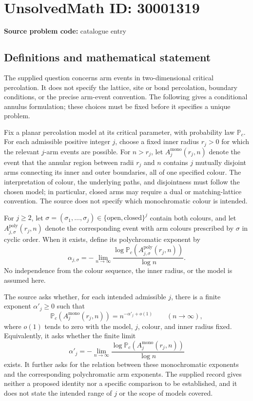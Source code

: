 \documentclass[11pt]{article}
\begin{document}
\section*{UnsolvedMath ID: 30001319}
\textbf{Source problem code:} catalogue entry
\subsection{Definitions and mathematical statement}
The supplied question concerns arm events in two-dimensional critical percolation. It does not specify the lattice, site or bond percolation, boundary conditions, or the precise arm-event convention. The following gives a conditional annulus formulation; these choices must be fixed before it specifies a unique problem.

Fix a planar percolation model at its critical parameter, with probability law \(\mathbb P_c\). For each admissible positive integer \(j\), choose a fixed inner radius \(r_j>0\) for which the relevant \(j\)-arm events are possible. For \(n>r_j\), let \(A_j^{\mathrm{mono}}(r_j,n)\) denote the event that the annular region between radii \(r_j\) and \(n\) contains \(j\) mutually disjoint arms connecting its inner and outer boundaries, all of one specified colour. The interpretation of colour, the underlying paths, and disjointness must follow the chosen model; in particular, closed arms may require a dual or matching-lattice convention. The source does not specify which monochromatic colour is intended.

For \(j\geq 2\), let \(\sigma=(\sigma_1,\ldots,\sigma_j)\in\{\mathrm{open},\mathrm{closed}\}^j\) contain both colours, and let \(A_{j,\sigma}^{\mathrm{poly}}(r_j,n)\) denote the corresponding event with arm colours prescribed by \(\sigma\) in cyclic order. When it exists, define its polychromatic exponent by
\[
\alpha_{j,\sigma}
=-\lim_{n\to\infty}
\frac{\log\mathbb P_c\!\left(A_{j,\sigma}^{\mathrm{poly}}(r_j,n)\right)}{\log n}.
\]
No independence from the colour sequence, the inner radius, or the model is assumed here.

The source asks whether, for each intended admissible \(j\), there is a finite exponent \(\alpha'_j\geq 0\) such that
\[
\mathbb P_c\!\left(A_j^{\mathrm{mono}}(r_j,n)\right)
=n^{-\alpha'_j+o(1)}
\qquad(n\to\infty),
\]
where \(o(1)\) tends to zero with the model, \(j\), colour, and inner radius fixed. Equivalently, it asks whether the finite limit
\[
\alpha'_j
=-\lim_{n\to\infty}
\frac{\log\mathbb P_c\!\left(A_j^{\mathrm{mono}}(r_j,n)\right)}{\log n}
\]
exists. It further asks for the relation between these monochromatic exponents and the corresponding polychromatic arm exponents. The supplied record gives neither a proposed identity nor a specific comparison to be established, and it does not state the intended range of \(j\) or the scope of models covered.
\end{document}
